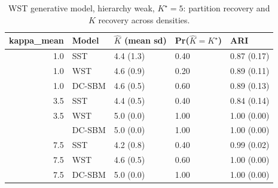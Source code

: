\begin{table}
\centering
\caption{WST generative model, hierarchy weak, $K^\star=5$: partition recovery and $K$ recovery across densities.}
\centering
\begin{tabular}[t]{rllll}
\toprule
kappa_mean & Model & $\hat K$ (mean sd) & Pr($\hat K = K^\star$) & ARI\\
\midrule
1.0 & SST & 4.4 (1.3) & 0.40 & 0.87 (0.17)\\
1.0 & WST & 4.6 (0.9) & 0.20 & 0.89 (0.11)\\
1.0 & DC-SBM & 4.6 (0.5) & 0.60 & 0.89 (0.13)\\
3.5 & SST & 4.4 (0.5) & 0.40 & 0.84 (0.14)\\
3.5 & WST & 5.0 (0.0) & 1.00 & 1.00 (0.00)\\
\addlinespace
3.5 & DC-SBM & 5.0 (0.0) & 1.00 & 1.00 (0.00)\\
7.5 & SST & 4.2 (0.8) & 0.40 & 0.99 (0.02)\\
7.5 & WST & 4.6 (0.5) & 0.60 & 1.00 (0.00)\\
7.5 & DC-SBM & 5.0 (0.0) & 1.00 & 1.00 (0.00)\\
\bottomrule
\end{tabular}
\end{table}
